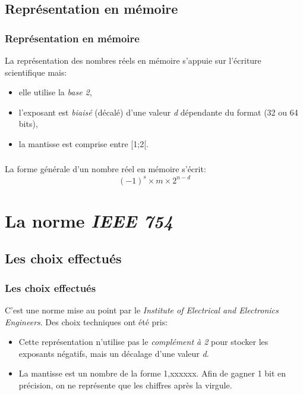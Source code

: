 \documentclass[svgnames,11pt]{beamer}
\begin{document}
\subsection{Représentation en mémoire}
\begin{frame}
    \frametitle{Représentation en mémoire}

    La représentation des nombres réels en mémoire s'appuie sur l'écriture scientifique mais:
    \begin{itemize}
        \item elle utilise la \emph{base 2},
        \item l'exposant est \emph{biaisé} (décalé) d'une valeur \emph{d} dépendante du format (32 ou 64 bits),
        \item la mantisse est comprise entre [1;2[.
    \end{itemize}

\end{frame}
\begin{frame}
    \frametitle{}

    \begin{aretenir}[]
        La forme générale d'un nombre réel en mémoire s'écrit:
        $$(-1)^s×m×2^{n-d}$$
    \end{aretenir}

\end{frame}
\section{La norme \emph{IEEE 754}}
\subsection{Les choix effectués}
\begin{frame}
    \frametitle{Les choix effectués}

    C'est une norme mise au point par le \emph{Institute of Electrical and Electronics Engineers}. Des choix techniques ont été pris:
    \begin{itemize}
        \item Cette représentation n'utilise pas le \emph{complément à 2} pour stocker les exposants négatifs, mais un décalage d'une valeur \emph{d}.
        \item La mantisse est un nombre de la forme 1,xxxxxx. Afin de gagner 1 bit en précision, on ne représente que les chiffres après la virgule.
    \end{itemize}

\end{frame}
\end{document}
